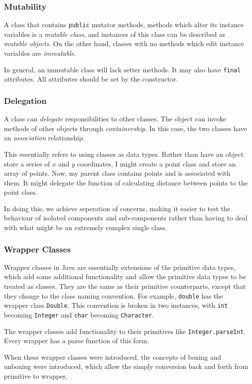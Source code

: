 \documentclass[12pt]{report}
\newcommand{\code}[1]{\lstinline{#1}}
\begin{document}
\begin{flushleft}
\subsubsection*{Mutability}

A class that contains \code{public} mutator methods, methods which alter its
instance variables is a \textit{mutable class}, and instances of this class
can be described as \textit{mutable objects}. On the other hand, classes with
no methods which edit instance variables are \textit{immutable}. \par
In general, an immutable class will lack setter methods. It may also have 
\code{final} attributes. All attributes should be set by the constructor.

\subsubsection*{Delegation}

A class can \textit{delegate} responsibilities to other classes. The object can
invoke methods of other objects through \textit{containership}. In this case,
the two classes have an \textit{association} relationship. \par
This essentially refers to using classes as data types. Rather than have an 
object store a series of \(x\) and \(y\) coordinates, I might create a point
class and store an array of points. Now, my parent class contains points and is
associated with them. It might delegate the function of calculating distance
between points to the point class. \par
In doing this, we achieve seperation of concerns, making it easier to test the
behaviour of isolated components and sub-components rather than having to
deal with what might be an extremely complex single class.

\subsubsection*{Wrapper Classes}

Wrapper classes in Java are essentially extensions of the primitive data types,
which add some additional functionality and allow the primitive data types to
be treated as classes. They are the same as their primitive counterparts, 
except that they change to the class naming convention. For example, 
\code{double} has the wrapper class \code{Double}. This convention is broken
in two instances, with \code{int} becoming \code{Integer} and \code{char} 
becoming \code{Character}. \par
The wrapper classes add functionality to their primitives like 
\code{Integer.parseInt}. Every wrapper has a parse function of this form. \par
When these wrapper classes were introduced, the concepts of boxing and unboxing
were introduced, which allow the simply conversion back and forth from 
primitive to wrapper.


\end{flushleft}
\end{document}
